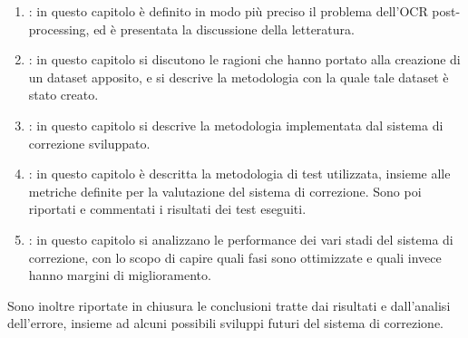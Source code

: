 \begin{enumerate}
\item \textbf{}: in questo capitolo è definito in modo più preciso il problema dell'OCR post-processing, ed è presentata la discussione della letteratura.

\item \textbf{}: in questo capitolo si discutono le ragioni che hanno portato alla creazione di un dataset apposito, e si descrive la metodologia con la quale tale dataset è stato creato.

\item \textbf{}: in questo capitolo si descrive la metodologia implementata dal sistema di correzione sviluppato.


\item \textbf{}: in questo capitolo è descritta la metodologia di test utilizzata, insieme alle metriche definite per la valutazione del sistema di correzione. Sono poi riportati e commentati i risultati dei test eseguiti.


\item \textbf{}: in questo capitolo si analizzano le performance dei vari stadi del sistema di correzione, con lo scopo di capire quali fasi sono ottimizzate e quali invece hanno margini di miglioramento.
\end{enumerate}
\noindent
Sono inoltre riportate in chiusura le conclusioni tratte dai risultati e dall'analisi dell'errore, insieme ad alcuni possibili sviluppi futuri del sistema di correzione.








